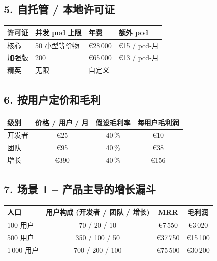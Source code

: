 \documentclass[11pt, a4paper, oneside]{article}
\begin{document}
\subsection*{5. 自托管 / 本地许可证}
\begin{center}
\begin{tabular}{@{}llll@{}}
\toprule
\textbf{许可证} & \textbf{并发 pod 上限} & \textbf{年费} & \textbf{额外 pod} \\
\midrule
核心 & 50 小型等价物 & €28\,000 & €15 / pod-月 \\
加强版 & 200 & €65\,000 & €13 / pod-月 \\
精英 & 无限 & 自定义 & --- \\
\bottomrule
\end{tabular}
\end{center}

\subsection*{6. 按用户定价和毛利}
\begin{center}
\begin{tabular}{@{}lccc@{}}
\toprule
\textbf{级别} & \textbf{价格 / 用户 / 月} & \textbf{假设毛利率} & \textbf{每用户毛利润} \\
\midrule
开发者 & €25 & 40\,\% & €10 \\
团队      & €95 & 40\,\% & €38 \\
增长    & €390 & 40\,\% & €156 \\
\bottomrule
\end{tabular}
\end{center}

\subsection*{7. 场景 1 – 产品主导的增长漏斗}
\begin{center}
\begin{tabular}{@{}lccc@{}}
\toprule
\textbf{人口} & \textbf{用户构成} (开发者 / 团队 / 增长) & \textbf{MRR} & \textbf{毛利润} \\
\midrule
100 用户   & 70 / 20 / 10    & €7\,550   & €3\,020  \\
500 用户   & 350 / 100 / 50  & €37\,750  & €15\,100 \\
1\,000 用户 & 700 / 200 / 100 & €75\,500  & €30\,200 \\
\bottomrule
\end{tabular}
\end{center}
\end{document}
